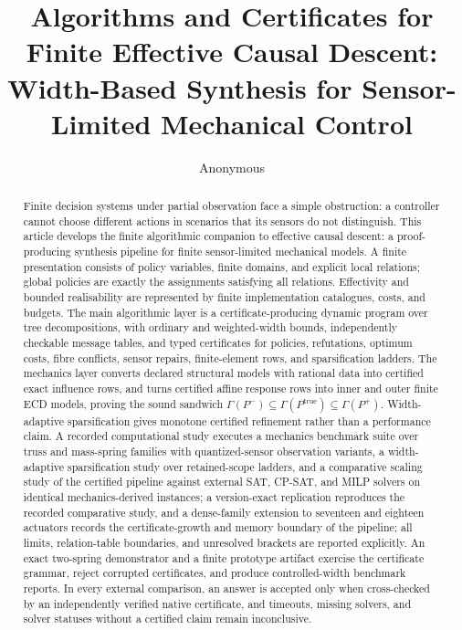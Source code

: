 \documentclass[11pt]{article}
\title{Algorithms and Certificates for Finite Effective Causal Descent:\\
Width-Based Synthesis for Sensor-Limited Mechanical Control}
\author{Anonymous}
\date{}
\theoremstyle{plain}
\theoremstyle{definition}
\theoremstyle{remark}
\begin{document}
\maketitle

\begin{abstract}
Finite decision systems under partial observation face a simple obstruction: a
controller cannot choose different actions in scenarios that its sensors do not
distinguish.  This article develops the finite algorithmic companion to
effective causal descent: a proof-producing synthesis pipeline for finite
sensor-limited mechanical models.  A finite presentation consists of policy variables, finite domains, and
explicit local relations; global policies are exactly the assignments satisfying
all relations.  Effectivity and bounded realisability are represented by finite
implementation catalogues, costs, and budgets.  The main algorithmic layer is a
certificate-producing dynamic program over tree decompositions, with ordinary
and weighted-width bounds, independently checkable message tables, and typed
certificates for policies, refutations, optimum costs, fibre conflicts, sensor
repairs, finite-element rows, and sparsification ladders.  The mechanics layer
converts declared structural models with rational data into certified exact
influence rows, and turns certified affine response rows into inner and outer
finite ECD models, proving the sound sandwich
\(\Gamma(P^-)\subseteq\Gamma(P^{\mathrm{true}})\subseteq\Gamma(P^+)\).
Width-adaptive sparsification gives monotone certified refinement rather than a
performance claim.  A recorded computational study executes a mechanics
benchmark suite over truss and mass-spring families with quantized-sensor
observation variants, a width-adaptive sparsification study over retained-scope
ladders, and a comparative scaling study of the certified pipeline against
external SAT, CP-SAT, and MILP solvers on identical mechanics-derived
instances; a version-exact replication reproduces the recorded comparative
study, and a dense-family extension to seventeen and eighteen actuators
records the certificate-growth and memory boundary of the pipeline; all
limits, relation-table boundaries, and unresolved brackets are
reported explicitly.  An exact two-spring demonstrator and a finite prototype
artifact exercise the certificate grammar, reject corrupted certificates, and
produce controlled-width benchmark reports.  In every external comparison, an
answer is accepted only when cross-checked by an independently verified native
certificate, and timeouts, missing solvers, and solver statuses without a
certified claim remain inconclusive.
\end{abstract}
\end{document}
